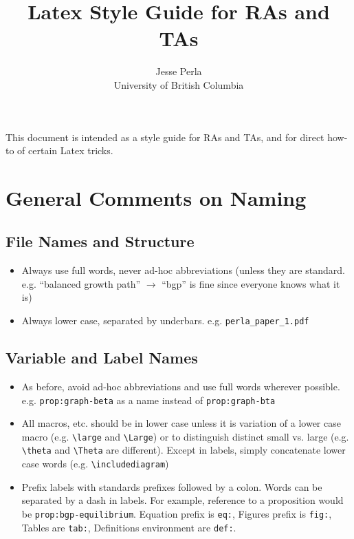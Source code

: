 \documentclass[12pt,etk-draft]{etk-article}
\begin{document}
	\title{Latex Style Guide for RAs and TAs}
	\author{Jesse Perla \\ University of British Columbia}
\date{}

	\maketitle %
		
This document is intended as a style guide for RAs and TAs, and for direct how-to of certain Latex tricks.	
\section{General Comments on Naming}
\subsection{File Names and Structure}
\begin{itemize}
\item Always use full words, never ad-hoc abbreviations (unless they are standard.  e.g. ``balanced growth path'' $\to$ ``bgp'' is fine since everyone knows what it is)
\item Always lower case, separated by underbars.  e.g. \verb!perla_paper_1.pdf!
\end{itemize}
\subsection{Variable and Label Names}
\begin{itemize}
\item As before, avoid ad-hoc abbreviations and use full words wherever possible.  e.g. \verb!prop:graph-beta! as a name instead of \verb!prop:graph-bta!
\item All macros, etc. should be in lower case unless it is variation of a lower case macro (e.g. \verb!\large! and \verb!\Large!) or to distinguish distinct small vs. large (e.g. \verb!\theta! and \verb!\Theta! are different).  Except in labels, simply concatenate lower case words (e.g. \verb!\includediagram!)
\item Prefix labels with standards prefixes followed by a colon.  Words can be separated by a dash in labels.  For example, reference to a proposition would be \verb!prop:bgp-equilibrium!.  Equation prefix is \verb!eq:!, Figures prefix is \verb!fig:!, Tables are \verb!tab:!, Definitions environment are \verb!def:!.
\end{itemize}
\end{document}
